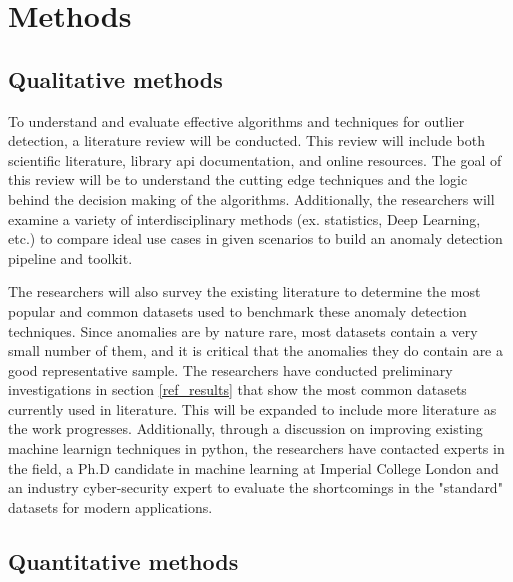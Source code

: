 \section{Methods}
\label{ref_methods}

\subsection{Qualitative methods}

To understand and evaluate effective algorithms and techniques for outlier detection, a literature review will be conducted. This review will include both scientific literature, library api documentation, and online resources. The goal of this review will be to understand the cutting edge techniques and the logic behind the decision making of the algorithms. Additionally, the researchers will examine a variety of interdisciplinary methods (ex. statistics, Deep Learning, etc.) to compare ideal use cases in given scenarios to build an anomaly detection pipeline and toolkit.  

The researchers will also survey the existing literature to determine the most popular and common datasets used to benchmark these anomaly detection techniques. Since anomalies are by nature rare, most datasets contain a very small number of them, and it is critical that the anomalies they do contain are a good representative sample. The researchers have conducted preliminary investigations in section \ref{ref_results} that show the most common datasets currently used in literature. This will be expanded to include more literature as the work progresses. Additionally, through a discussion on improving existing machine learnign techniques in python, the researchers have contacted experts in the field, a Ph.D candidate in machine learning at Imperial College London and an industry cyber-security expert to evaluate the shortcomings in the "standard" datasets for modern applications. 


\subsection{Quantitative methods}

